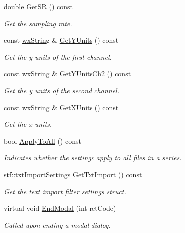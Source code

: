 \begin{DoxyCompactItemize}
double \hyperlink{classwxStfTextImportDlg_a13e68b74da2a1dde07fdcb5ad4cff52e}{GetSR} () const 
\begin{DoxyCompactList}\small\item\em Get the sampling rate. \item\end{DoxyCompactList}\item 
const \hyperlink{classwxString}{wxString} \& \hyperlink{classwxStfTextImportDlg_ad2dec38e6ab5b1979c73c5044a92375e}{GetYUnits} () const 
\begin{DoxyCompactList}\small\item\em Get the y units of the first channel. \item\end{DoxyCompactList}\item 
const \hyperlink{classwxString}{wxString} \& \hyperlink{classwxStfTextImportDlg_a87a7687f91f2079ab1d5578919d4c889}{GetYUnitsCh2} () const 
\begin{DoxyCompactList}\small\item\em Get the y units of the second channel. \item\end{DoxyCompactList}\item 
const \hyperlink{classwxString}{wxString} \& \hyperlink{classwxStfTextImportDlg_a286b8d199791e4466e6e72f999225b8e}{GetXUnits} () const 
\begin{DoxyCompactList}\small\item\em Get the x units. \item\end{DoxyCompactList}\item 
bool \hyperlink{classwxStfTextImportDlg_a53dcb2a88d4f9206fc6da5b560eacc47}{ApplyToAll} () const 
\begin{DoxyCompactList}\small\item\em Indicates whether the settings apply to all files in a series. \item\end{DoxyCompactList}\item 
\hyperlink{structstf_1_1txtImportSettings}{stf::txtImportSettings} \hyperlink{classwxStfTextImportDlg_a8126cf0162db6085c957d68f126697a1}{GetTxtImport} () const 
\begin{DoxyCompactList}\small\item\em Get the text import filter settings struct. \item\end{DoxyCompactList}\item 
virtual void \hyperlink{classwxStfTextImportDlg_a29859d753e16db8bbbc61924cbb15b78}{EndModal} (int retCode)
\begin{DoxyCompactList}\small\item\em Called upon ending a modal dialog. \item\end{DoxyCompactList}\end{DoxyCompactItemize}


